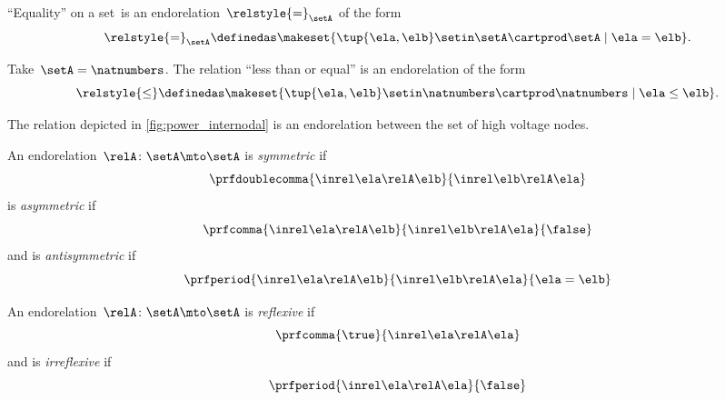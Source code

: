 \begin{example}
    ``Equality'' on a set~\setA is an endorelation~$\relstyle{=}_\setA$ of the form
    \begin{equation}
        \relstyle{=}_\setA \definedas \makeset{\tup{\ela,\elb}\setin \setA\cartprod \setA \mid \ela=\elb}.
    \end{equation}
\end{example}

\begin{example}
    Take~$\setA=\natnumbers$.
    The relation ``less than or equal'' is an endorelation of the form
    \begin{equation}
        \relstyle{\leq} \definedas  \makeset{\tup{\ela,\elb}\setin \natnumbers\cartprod \natnumbers\mid \ela \leq \elb}.
    \end{equation}
\end{example}

\begin{example}
    The relation depicted in \cref{fig:power_internodal} is an endorelation between the set of high voltage nodes.
\end{example}

\begin{ctdefinition}
    \label{def:endo_sym_asym_antisym}
    \label{def:antisymmetry}
    An endorelation~$\relA\colon \setA\mto \setA$ is \emph{symmetric} if
    \begin{equation}\label{eq:symmetric}
        \prfdoublecomma{
            \inrel \ela \relA \elb
        }{
            \inrel \elb \relA \ela
        }
    \end{equation}
    is \emph{asymmetric} if
    \begin{equation}\label{eq:asymmetric}
        \prfcomma{
            \inrel \ela \relA \elb
        }{
            \inrel \elb \relA \ela
        }{
            \false
        }
    \end{equation}
    and is \emph{antisymmetric} if
    \begin{equation}\label{eq:antisymmetric}
        \prfperiod{
            \inrel \ela \relA \elb
        }{
            \inrel \elb \relA \ela
        }{
            \ela = \elb
        }
    \end{equation}
\end{ctdefinition}

\begin{ctdefinition}
    \label{def:endo_reflexive_irreflexive}
    An endorelation~$\relA\colon \setA\mto \setA$ is \emph{reflexive} if
    \begin{equation}\label{eq:reflexive}
        \prfcomma{
            \true
        }{
            \inrel \ela \relA \ela
        }
    \end{equation}
    and is \emph{irreflexive} if
    \begin{equation}\label{eq:irreflexive}
        \prfperiod{
            \inrel \ela \relA \ela
        }{
            \false
        }
    \end{equation}
\end{ctdefinition}

